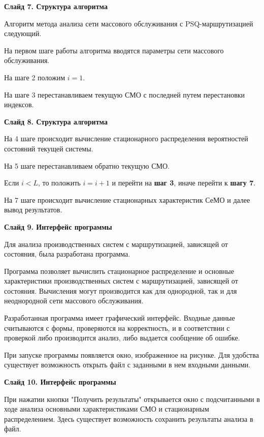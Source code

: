 \documentclass[a4paper,14pt]{extarticle}
\theoremstyle{note}
\begin{document}
\textbf{Слайд 7. Структура алгоритма}

Алгоритм метода анализа сети массового обслуживания с PSQ-маршрутизацией следующий.

На первом шаге работы алгоритма вводятся параметры сети массового обслуживания.

На шаге 2 положим $i = 1$.

На шаге 3 перестанавливаем текущую СМО с последней путем перестановки индексов.


\textbf{Слайд 8. Структура алгоритма}

На 4 шаге происходит вычисление стационарного распределения вероятностей состояний текущей системы.

На 5 шаге перестанавливаем обратно текущую СМО.

Если $i < L$, то положить $i=i+1$ и перейти на \textbf{шаг 3}, иначе перейти к \textbf{шагу 7}.

На 7 шаге происходит вычисление стационарных характеристик СеМО и далее вывод результатов.


\textbf{Слайд 9. Интерфейс программы}

Для анализа производственных систем с маршрутизацией, зависящей от состояния, была разработана программа.

Программа позволяет вычислить стационарное распределение и основные характеристики производственных систем с маршрутизацией, зависящей от состояния. Вычисления могут производится как для однородной, так и для неоднородной сети массового обслуживания.

Разработанная программа имеет графический интерфейс. Входные данные считываются с формы, проверяются на корректность, и в соответствии с проверкой либо производится анализ, либо выдается сообщение об ошибке.

При запуске программы появляется окно, изображенное на рисунке. Для удобства существует возможность открыть файл с заданными в нем входными данными.


\textbf{Слайд 10. Интерфейс программы}

При нажатии кнопки "Получить результаты" открывается окно с подсчитанными в ходе анализа основными характеристиками СМО и стационарным распределением. Здесь существует возможность сохранить результаты анализа в файл.
\end{document}
